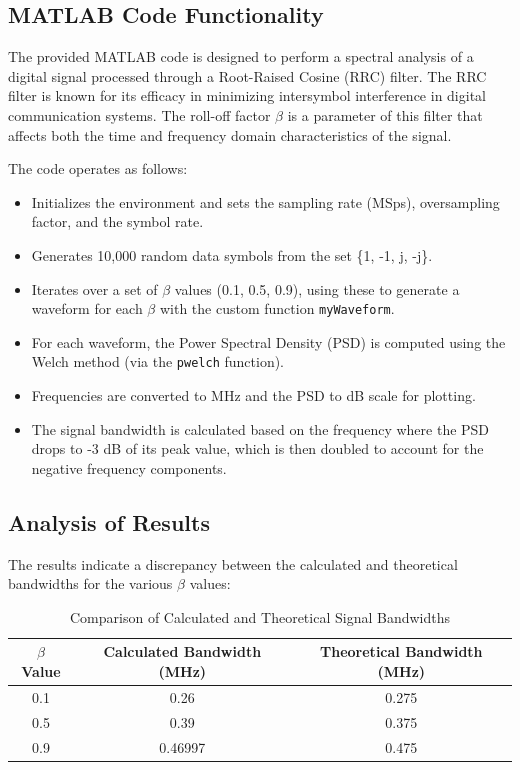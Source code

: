 \documentclass{article}
\begin{document}
\subsection{MATLAB Code Functionality}

The provided MATLAB code is designed to perform a spectral analysis of a digital signal processed through a Root-Raised Cosine (RRC) filter. The RRC filter is known for its efficacy in minimizing intersymbol interference in digital communication systems. The roll-off factor $\beta$ is a parameter of this filter that affects both the time and frequency domain characteristics of the signal.

The code operates as follows:

\begin{itemize}
  \item Initializes the environment and sets the sampling rate (MSps), oversampling factor, and the symbol rate.
  \item Generates 10,000 random data symbols from the set \{1, -1, j, -j\}.
  \item Iterates over a set of $\beta$ values (0.1, 0.5, 0.9), using these to generate a waveform for each $\beta$ with the custom function \texttt{myWaveform}.
  \item For each waveform, the Power Spectral Density (PSD) is computed using the Welch method (via the \texttt{pwelch} function).
  \item Frequencies are converted to MHz and the PSD to dB scale for plotting.
  \item The signal bandwidth is calculated based on the frequency where the PSD drops to -3 dB of its peak value, which is then doubled to account for the negative frequency components.
\end{itemize}

\subsection{Analysis of Results}

The results indicate a discrepancy between the calculated and theoretical bandwidths for the various $\beta$ values:

\begin{table}[h]
\centering
\begin{tabular}{|c|c|c|}
\hline
$\beta$ Value & Calculated Bandwidth (MHz) & Theoretical Bandwidth (MHz) \\
\hline
0.1 & \num{0.26} & \num{0.275} \\
0.5 & \num{0.39} & \num{0.375} \\
0.9 & \num{0.46997} & \num{0.475} \\
\hline
\end{tabular}
\caption{Comparison of Calculated and Theoretical Signal Bandwidths}
\label{tab:bandwidth_comparison}
\end{table}
\end{document}
